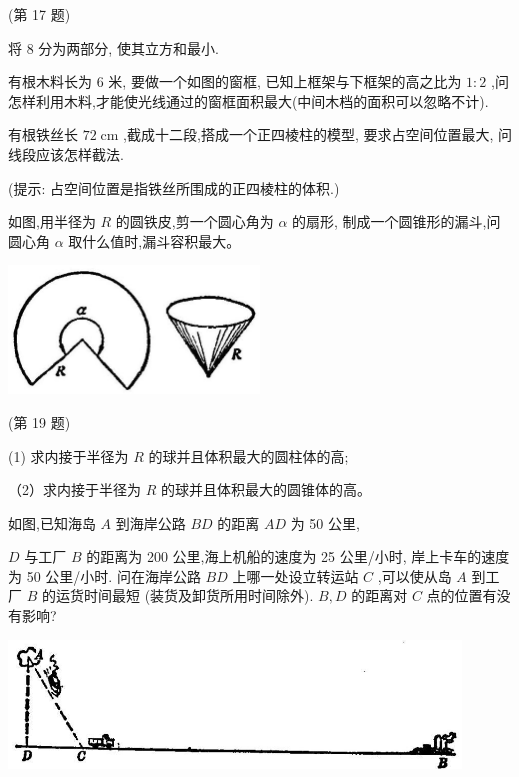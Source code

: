 \documentclass[lang=cn,newtx,10pt,scheme=chinese]{elegantbook}
\begin{document}
\begin{problemset}[习 题 十 一]
(第 17 题)

\item 将 8 分为两部分, 使其立方和最小.

\item 有根木料长为 6 米, 要做一个如图的窗框, 已知上框架与下框架的高之比为 \(1 : 2\) ,问怎样利用木料,才能使光线通过的窗框面积最大(中间木档的面积可以忽略不计).

\item 有根铁丝长 \({72}\mathrm{\;{cm}}\) ,截成十二段,搭成一个正四棱柱的模型, 要求占空间位置最大, 问线段应该怎样截法.

(提示: 占空间位置是指铁丝所围成的正四棱柱的体积.)

\item 如图,用半径为 \(R\) 的圆铁皮,剪一个圆心角为 \(\alpha\) 的扇形, 制成一个圆锥形的漏斗,问圆心角 \(\alpha\) 取什么值时,漏斗容积最大。

\begin{center}
\includegraphics[max width=0.5\textwidth]{images/01912c18-5c3f-733d-b775-749ba9897a9d_157_936491.jpg}
\end{center}

(第 19 题)

\item (1) 求内接于半径为 \(R\) 的球并且体积最大的圆柱体的高;

（2）求内接于半径为 \(R\) 的球并且体积最大的圆锥体的高。

\item 如图,已知海岛 \(A\) 到海岸公路 \({BD}\) 的距离 \({AD}\) 为 50 公里,

\(D\) 与工厂 \(B\) 的距离为 200 公里,海上机船的速度为 25 公里/小时, 岸上卡车的速度为 50 公里/小时. 问在海岸公路 \({BD}\) 上哪一处设立转运站 \(C\) ,可以使从岛 \(A\) 到工厂 \(B\) 的运货时间最短 (装货及卸货所用时间除外). \(B,D\) 的距离对 \(C\) 点的位置有没有影响?

\begin{center}
\includegraphics[max width=0.9\textwidth]{images/01912c18-5c3f-733d-b775-749ba9897a9d_158_569376.jpg}
\end{center}


\end{problemset}
\end{document}
